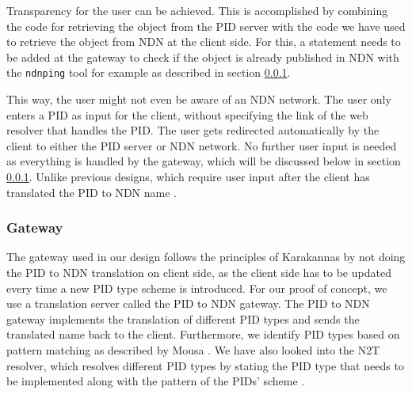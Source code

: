 
Transparency for the user can be achieved. This is accomplished by combining the code for retrieving the object from the PID server with the code we have used to retrieve the object from NDN at the client side. For this, a statement needs to be added at the gateway to check if the object is already published in NDN with the \texttt{ndnping} tool \cite{ndn-tools} for example as described in section \ref{gw}. 


This way, the user might not even be aware of an NDN network. The user only enters a PID as input for the client, without specifying the link of the web resolver that handles the PID. The user gets redirected automatically by the client to either the PID server or NDN network. No further user input is needed as everything is handled by the gateway, which will be discussed below in section \ref{gw}. 
Unlike previous designs, which require user input after the client has translated the PID to NDN name \cite{ndn-app-aware}. 


\subsubsection{Gateway}\label{gw}
The gateway used in our design follows the principles of Karakannas by not doing the PID to NDN translation on client side, as the client side has to be updated every time a new PID type scheme is introduced. For our proof of concept, we use a translation server called the PID to NDN gateway. The PID to NDN gateway implements the translation of different PID types and sends the translated name back to the client. Furthermore, we identify PID types based on pattern matching as described by Mousa \cite{ndn-app-aware}. We have also looked into the N2T resolver, which resolves different PID types by stating the PID type that needs to be implemented along with the pattern of the PIDs' scheme \cite{n2t}.

